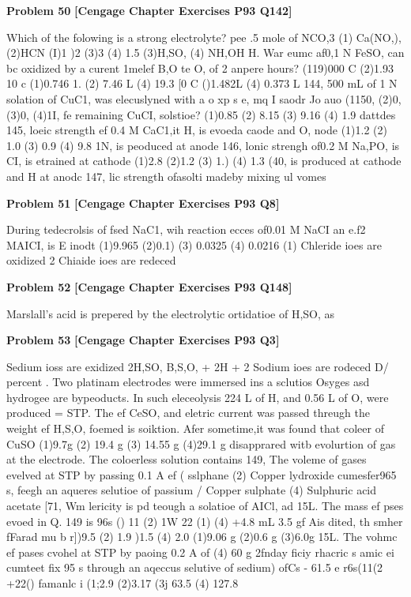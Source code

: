 \begin{problembox}
\textbf{Problem 50} \hfill \textbf{[Cengage Chapter Exercises P93 Q142]}
\label{q:ext-cng-th-50}

Which of the folowing is a strong electrolyte?
pee .5 mole of NCO,3
(1) Ca(NO,),
(2)HCN
(I)1
)2
(3)3
(4) 1.5
(3)H,SO,
(4) NH,OH
H. War eumc af0,1 N FeSO, can bc oxidized by a curent
1melef B,O te O,
of 2 anpere hours?
(119)000 C
(2)1.93   10  c
(1)0.746 1.
(2) 7.46 L
(4) 19.3   [0  C
()1.482L
(4) 0.373 L
144, 500 mL of 1 N solation of CuC1, was elecuslyned with a
o  xp s e, mq I  saodr  Jo auo
(1150,
(2)0,
(3)0,
(4)1I,
fe remaining CuCI, solstioe?
(1)0.85
(2) 8.15
(3) 9.16
(4) 1.9
dattdes
145, loeic strength ef 0.4 M CaC1,it
H, is evoeda caode and O,  node
(1)1.2
(2) 1.0
(3) 0.9
(4) 9.8
1N, is peoduced at anode
146, lonic strengh of0.2 M Na,PO, is
CI, is etrained at cathode
(1)2.8
(2)1.2
(3) 1.)
(4) 1.3
(40, is produced at cathode and H at anodc
147, lic strength ofasolti madeby mixing ul vomes
\end{problembox}

\begin{problembox}
\textbf{Problem 51} \hfill \textbf{[Cengage Chapter Exercises P93 Q8]}
\label{q:ext-cng-th-51}

During tedecrolsis of fsed NaC1, wih reaction ecces
of0.01 M NaCI an e.f2 MAICI, is
E inodt
(1)9.965
(2)0.1)
(3) 0.0325
(4) 0.0216
(1) Chleride ioes are oxidized
2 Chiaide ioes are redeced
\end{problembox}

\begin{problembox}
\textbf{Problem 52} \hfill \textbf{[Cengage Chapter Exercises P93 Q148]}
\label{q:ext-cng-th-52}

Marslall's acid is prepered by the electrolytic ortidatioe of
H,SO, as
\end{problembox}

\begin{problembox}
\textbf{Problem 53} \hfill \textbf{[Cengage Chapter Exercises P93 Q3]}
\label{q:ext-cng-th-53}

Sedium ioss are exidized
2H,SO,  B,S,O, + 2H  + 2
Sodium ioes are rodeced
D/ percent . Two platinam electrodes were immersed ins a sclutios
Osyges asd hydrogee are bypeoducts. In such eleceolysis
224 L of H, and 0.56 L of O, were produced = STP. The
ef CeSO, and eletric current was passed threugh the
weight ef H,S,O, foemed is
soiktion. Afer sometime,it was found that coleer of CuSO
(1)9.7g
(2) 19.4 g
(3) 14.55 g
(4)29.1 g
disapprared witb evolurtion of gas at the electrode. The
coloerless solution contains
149, The voleme of gases evelved at STP by passing 0.1 A ef
(  sslphane
(2) Copper lydroxide
cumesfer965 s, feegh an aqueres selutioe of passium
/ Copper sulphate
(4) Sulphuric acid
acetate
[71, Wm lericity is pd teough a solatioe of AICl, ad
15L. The mass ef pses evoed in Q. 149 is
 96s () 11 (2) 1W 22 (1)
(4) +4.8 mL
3.5 gf Ais dited, th smher fFarad mu b
r])9.5
(2) 1.9
)1.5
(4) 2.0
(1)9.06 g
(2)0.6 g
(3)6.0g
15L. The vohmc ef pases cvohel at STP by paoing 0.2 A of
(4) 60 g
2fnday ficiy rhacric s amic ei
cumteet fix 95 s through an aqeccus selutive of sedium)
ofCs - 61.5
e r6s(11(2 +22()
famanlc i
(1;2.9
(2)3.17
(3j 63.5
(4) 127.8
\end{problembox}

